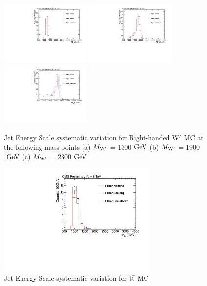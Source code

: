 \begin{figure}[htcb]
\begin{center}
\includegraphics[width=0.4\textwidth]{AN-13-004/figs/Signal_M1300_PtScaling}
\includegraphics[width=0.4\textwidth]{AN-13-004/figs/Signal_M1900_PtScaling}
\includegraphics[width=0.4\textwidth]{AN-13-004/figs/Signal_M2300_PtScaling}
\caption{
Jet Energy Scale systematic variation for Right-handed $\mathrm{W}^\prime$ MC at the following mass points
(a) $M_{\mathrm{W}^\prime}$ = 1300$~\mathrm{GeV}$ 
(b) $M_{\mathrm{W}^\prime}$ = 1900$~\mathrm{GeV}$
(c) $M_{\mathrm{W}^\prime}$ = 2300$~\mathrm{GeV}$ 
}
\label{figs:signalJES}
\end{center}
\end{figure}

\begin{figure}[htcb]
\begin{center}
\includegraphics[width=0.7\textwidth]{AN-13-004/figs/TTbar_PtScaling}
\caption{Jet Energy Scale systematic variation for $\mathrm{t\overline{t}}$ MC}
\label{figs:ttbarJES}
\end{center}
\end{figure}

